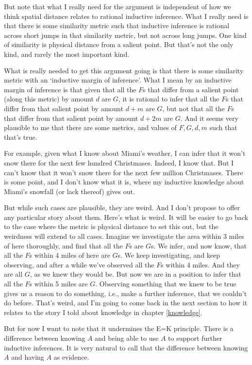 \documentclass[11pt,]{book}
\begin{document}
But note that what I really need for the argument is independent of how we think spatial distance relates to rational inductive inference. What I really need is that there is some similarity metric such that inductive inference is rational across short jumps in that similarity metric, but not across long jumps. One kind of similarity is physical distance from a salient point. But that's not the only kind, and rarely the most important kind.

What is really needed to get this argument going is that there is some similarity metric with an `inductive margin of inference'. What I mean by an inductive margin of inference is that given that all the \(F\)s that differ from a salient point (along this metric) by amount \(d\) are \(G\), it is rational to infer that all the \(F\)s that differ from that salient point by amount \(d + m\) are \(G\), but not that all the \(F\)s that differ from that salient point by amount \(d + 2m\) are \(G\). And it seems very plausible to me that there are some metrics, and values of \(F, G, d, m\) such that that's true.

For example, given what I know about Miami's weather, I can infer that it won't snow there for the next few hundred Christmases. Indeed, I know that. But I can't know that it won't snow there for the next few million Christmases. There is some point, and I don't know what it is, where my inductive knowledge about Miami's snowfall (or lack thereof) gives out.

But while such cases are plausible, they are weird. And I don't propose to offer any particular story about them. Here's what is weird. It will be easier to go back to the case where the metric is physical distance to set this out, but the weirdness will extend to all cases. Imagine we investigate the area within 3 miles of here thoroughly, and find that all the \(F\)s are \(G\)s. We infer, and now know, that all the \(F\)s within 4 miles of here are \(G\)s. We keep investigating, and keep observing, and after a while we've observed all the \(F\)s within 4 miles. And they are all \(G\), as we knew they would be. But now we are in a position to infer that all the \(F\)s within 5 miles are \(G\). Observing something that we knew to be true gives us a reason to do something, i.e., make a further inference, that we couldn't do before. That's weird, and I'm going to come back in the next section to how it relates to the story I told about knowledge in chapter \ref{knowledge}.

But for now I want to note that it undermines the E=K principle. There is a difference between knowing \(A\) and being able to use \(A\) to support further inductive inferences. It is very natural to call that the difference between knowing \(A\) and having \(A\) as evidence.
\end{document}

